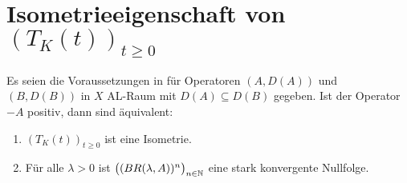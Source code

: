 \section{Isometrieeigenschaft von $(T_K(t))_{t\geq0}$}

\begin{fsatz}\cite{kato_1954}\label{Charakterisierung der Normiertheit von T_K(t)}
Es seien die Voraussetzungen in  für Operatoren $(A, D(A))$ und $(B, D(B))$ in $X$ AL-Raum mit $D(A)\subseteq D(B)$ gegeben. Ist der Operator $-A$ positiv, dann sind äquivalent:
\begin{enumerate}
\item $(T_K(t))_{t\geq0}$ ist eine Isometrie.
\item Für alle $\lambda >0$ ist $\big((BR(\lambda, A))^n \big)_{n\in\mathbb{N}}$ eine stark konvergente Nullfolge. 
\end{enumerate}
\end{fsatz}



